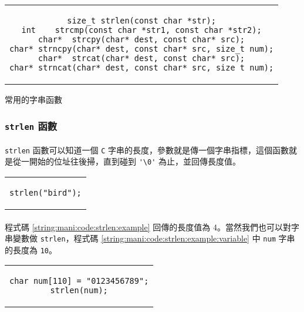 \documentclass[12pt,a4paper,oneside]{report}
\begin{document}
\begin{CJK}{UTF8}{bkai}
\begin{code}[h!]
  \centering
  \begin{tabular}{c}
  \begin{lstlisting}
size_t strlen(const char *str);
int    strcmp(const char *str1, const char *str2);
char*  strcpy(char* dest, const char* src);
char* strncpy(char* dest, const char* src, size_t num);
char*  strcat(char* dest, const char* src);
char* strncat(char* dest, const char* src, size_t num);
  \end{lstlisting}
  \end{tabular}
  \caption{常用的字串函數}
  \label{string:mani:code:string:function}
\end{code}

\subsubsection{\lstinline!strlen! 函數}

\paragraph{}\lstinline!strlen! 函數可以知道一個 \texttt{C} 字串的長度，參數就是傳一個字串指標，這個函數就是從一開始的位址往後掃，直到碰到 \lstinline!'\0'! 為止，並回傳長度值。

\begin{code}[h!]
  \centering
  \begin{tabular}{c}
  \begin{lstlisting}
strlen("bird");
  \end{lstlisting}
  \end{tabular}
  \caption{\lstinline!strlen! 範例}
  \label{string:mani:code:strlen:example}
\end{code}

\paragraph{}程式碼 \ref{string:mani:code:strlen:example} 回傳的長度值為 4。當然我們也可以對字串變數做 \lstinline!strlen!，程式碼 \ref{string:mani:code:strlen:example:variable} 中 \lstinline!num! 字串的長度為 \lstinline!10!。

\begin{code}[h!]
  \centering
  \begin{tabular}{c}
  \begin{lstlisting}
char num[110] = "0123456789";
strlen(num);
  \end{lstlisting}
  \end{tabular}
  \caption{\lstinline!strlen! 範例}
  \label{string:mani:code:strlen:example:variable}
\end{code}


\end{CJK}
\end{document}
